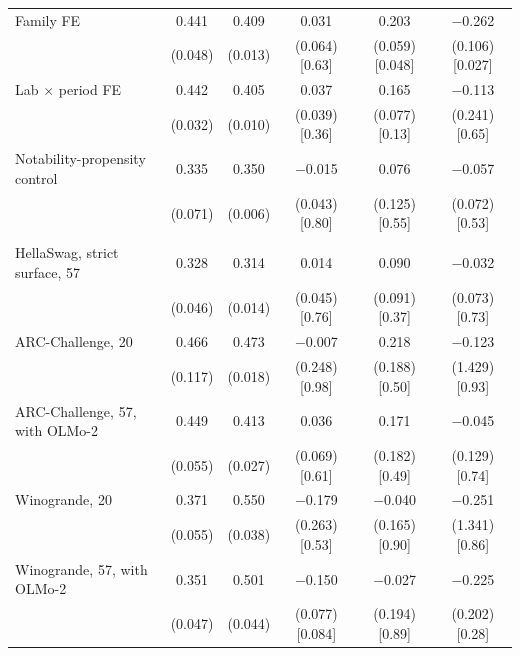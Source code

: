 \begin{table}[tp]
\begin{tabular}{@{}l ccc c c@{}}
Family FE & 0.441 & 0.409 & 0.031 & 0.203 & $-$0.262 \\
 & (0.048) & (0.013) & (0.064) [0.63] & (0.059) [0.048] & (0.106) [0.027] \\
Lab $\times$ period FE & 0.442 & 0.405 & 0.037 & 0.165 & $-$0.113 \\
 & (0.032) & (0.010) & (0.039) [0.36] & (0.077) [0.13] & (0.241) [0.65] \\
Notability-propensity control & 0.335 & 0.350 & $-$0.015 & 0.076 & $-$0.057 \\
 & (0.071) & (0.006) & (0.043) [0.80] & (0.125) [0.55] & (0.072) [0.53] \\
\addlinespace[3pt]
\multicolumn{6}{@{}l}{\textit{Panel C. OLS, other outputs and supports}} \\
HellaSwag, strict surface, 57 & 0.328 & 0.314 & 0.014 & 0.090 & $-$0.032 \\
 & (0.046) & (0.014) & (0.045) [0.76] & (0.091) [0.37] & (0.073) [0.73] \\
ARC-Challenge, 20 & 0.466 & 0.473 & $-$0.007 & 0.218 & $-$0.123 \\
 & (0.117) & (0.018) & (0.248) [0.98] & (0.188) [0.50] & (1.429) [0.93] \\
ARC-Challenge, 57, with OLMo-2 & 0.449 & 0.413 & 0.036 & 0.171 & $-$0.045 \\
 & (0.055) & (0.027) & (0.069) [0.61] & (0.182) [0.49] & (0.129) [0.74] \\
Winogrande, 20 & 0.371 & 0.550 & $-$0.179 & $-$0.040 & $-$0.251 \\
 & (0.055) & (0.038) & (0.263) [0.53] & (0.165) [0.90] & (1.341) [0.86] \\
Winogrande, 57, with OLMo-2 & 0.351 & 0.501 & $-$0.150 & $-$0.027 & $-$0.225 \\
 & (0.047) & (0.044) & (0.077) [0.084] & (0.194) [0.89] & (0.202) [0.28] \\
\bottomrule
\end{tabular}


\end{table}
